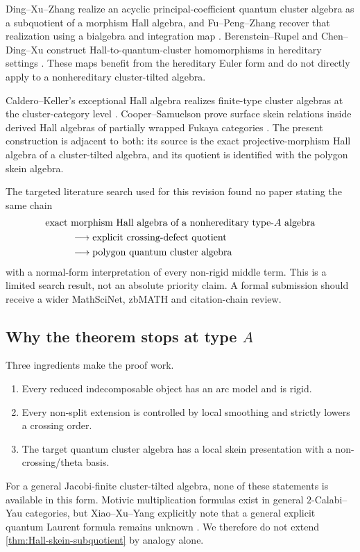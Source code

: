 Ding--Xu--Zhang realize an acyclic principal-coefficient quantum cluster
algebra as a subquotient of a morphism Hall algebra, and Fu--Peng--Zhang recover
that realization using a bialgebra and integration map
\cite{DingXuZhang,FuPengZhang}.  Berenstein--Rupel and Chen--Ding--Xu construct
Hall-to-quantum-cluster homomorphisms in hereditary settings
\cite{BerensteinRupel,ChenDingXu}.  These maps benefit from the hereditary Euler
form and do not directly apply to a nonhereditary cluster-tilted algebra.

Caldero--Keller's exceptional Hall algebra realizes finite-type cluster
algebras at the cluster-category level \cite{CalderoKeller}.  Cooper--Samuelson
prove surface skein relations inside derived Hall algebras of partially wrapped
Fukaya categories \cite{CooperSamuelson}.  The present construction is
adjacent to both: its source is the exact projective-morphism Hall algebra of a
cluster-tilted algebra, and its quotient is identified with the polygon skein
algebra.

The targeted literature search used for this revision found no paper stating
the same chain
\[
 \begin{aligned}
 &\text{exact morphism Hall algebra of a nonhereditary type-$A$ algebra}\\
 &\hspace{2.7em}\longrightarrow
   \text{explicit crossing-defect quotient}\\
 &\hspace{2.7em}\longrightarrow
   \text{polygon quantum cluster algebra}
 \end{aligned}
\]
with a normal-form interpretation of every non-rigid middle term.  This is a
limited search result, not an absolute priority claim.  A formal submission
should receive a wider MathSciNet, zbMATH and citation-chain review.

\subsection{Why the theorem stops at type $A$}

Three ingredients make the proof work.
\begin{enumerate}[label=(\arabic*),leftmargin=2.3em]
\item Every reduced indecomposable object has an arc model and is rigid.
\item Every non-split extension is controlled by local smoothing and strictly
      lowers a crossing order.
\item The target quantum cluster algebra has a local skein presentation with a
      non-crossing/theta basis.
\end{enumerate}
For a general Jacobi-finite cluster-tilted algebra, none of these statements is
available in this form.  Motivic multiplication formulas exist in general
$2$-Calabi--Yau categories, but Xiao--Xu--Yang explicitly note that a general
explicit quantum Laurent formula remains unknown \cite{XiaoXuYang}.  We
therefore do not extend \cref{thm:Hall-skein-subquotient} by analogy alone.

